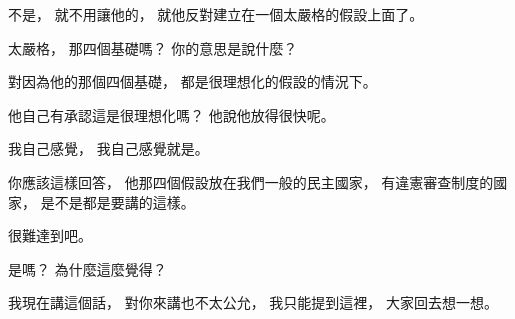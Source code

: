 \hypertarget{w06:cue:3228}{}不是，
\hypertarget{w06:cue:3229}{}就不用讓他的，
\hypertarget{w06:cue:3230}{}就他反對建立在一個太嚴格的假設上面了。

\hypertarget{w06:cue:3231}{}太嚴格，
\hypertarget{w06:cue:3232}{}那四個基礎嗎？
\hypertarget{w06:cue:3233}{}你的意思是說什麼？

\hypertarget{w06:cue:3234}{}對因為他的那個四個基礎，
\hypertarget{w06:cue:3235}{}都是很理想化的假設的情況下。

\hypertarget{w06:cue:3236}{}他自己有承認這是很理想化嗎？
\hypertarget{w06:cue:3237}{}他說他放得很快呢。

\hypertarget{w06:cue:3238}{}我自己感覺，
\hypertarget{w06:cue:3239}{}我自己感覺就是。

\hypertarget{w06:cue:3240}{}你應該這樣回答，
\hypertarget{w06:cue:3241}{}他那四個假設放在我們一般的民主國家，
\hypertarget{w06:cue:3242}{}有違憲審查制度的國家，
\hypertarget{w06:cue:3243}{}是不是都是要講的這樣。

\hypertarget{w06:cue:3244}{}很難達到吧。

\hypertarget{w06:cue:3245}{}是嗎？
\hypertarget{w06:cue:3246}{}為什麼這麼覺得？

\hypertarget{w06:cue:3247}{}我現在講這個話，
\hypertarget{w06:cue:3248}{}對你來講也不太公允，
\hypertarget{w06:cue:3249}{}我只能提到這裡，
\hypertarget{w06:cue:3250}{}大家回去想一想。

